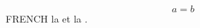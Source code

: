 \documentclass{article}
\begin{document}
\begin{equation} a=b \label{eq:relation} \end{equation}
FRENCH la  et la .
\end{document}

